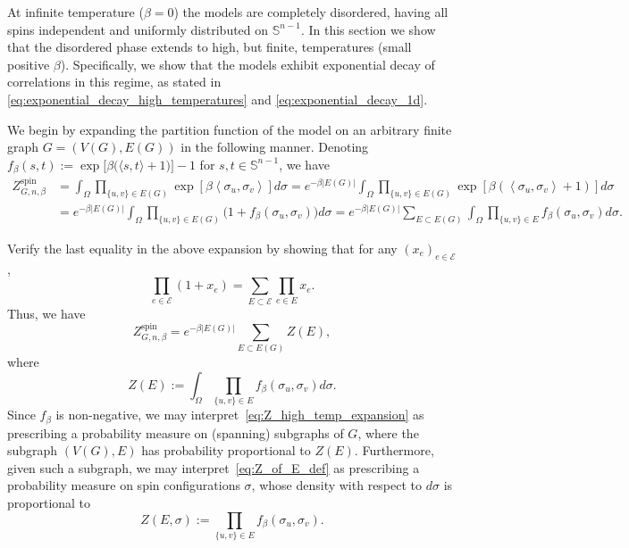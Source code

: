 \documentclass[12pt,reqno]{article}
\renewcommand{\S}{\mathbb{S}}
\begin{document}
At infinite temperature ($\beta=0$) the models are completely
disordered, having all spins independent and uniformly distributed on $\S^{n-1}$. In this section we show that the disordered phase extends to high, but finite, temperatures (small positive $\beta$). Specifically, we show that the models exhibit
exponential decay of correlations in this regime, as stated in \eqref{eq:exponential_decay_high_temperatures} and \eqref{eq:exponential_decay_1d}.

We begin by expanding the partition function of the model on an arbitrary finite graph $G = (V(G), E(G))$ in the following manner. Denoting $f_\beta(s,t) := \exp \big[\beta \big(\langle s,t
\rangle + 1\big)\big] - 1$ for $s,t \in \S^{n-1}$, we have
\begin{equation}\label{eq:high-temperature_expansion}
\begin{split}
Z^{\text{spin}}_{G,n,\beta}
 &= \int_{\Omega} \prod_{\{u,v\}\in
    E(G)} \exp \left[\beta \left\langle\sigma_u,\sigma_v\right\rangle\right] d\sigma
 = e^{-\beta |E(G)|} \int_{\Omega} \prod_{\{u,v\}\in
    E(G)} \exp \left[\beta \left(\left\langle\sigma_u,\sigma_v\right\rangle + 1\right)\right] d\sigma \\
 &= e^{-\beta |E(G)|} \int_{\Omega} \prod_{\{u,v\}\in
    E(G)} \big( 1 + f_\beta(\sigma_u,\sigma_v) \big) d\sigma
 = e^{-\beta |E(G)|} \sum_{E \subset E(G)} \int_{\Omega} \prod_{\{u,v\}\in
    E} f_\beta(\sigma_u,\sigma_v) d\sigma.
\end{split}
\end{equation}

\medbreak
{}
Verify the last equality in the above expansion by showing that for any $(x_e)_{e \in \mathcal{E}}$,
\[ \prod_{e \in \mathcal{E}} (1+x_e) = \sum_{E \subset \mathcal{E}} \prod_{e \in E} x_e .\]
\medbreak
Thus, we have
\begin{equation}\label{eq:Z_high_temp_expansion}
Z^{\text{spin}}_{G,n,\beta} = e^{-\beta |E(G)|} \sum_{E \subset
E(G)} Z(E) ,
\end{equation}
where
\begin{equation}\label{eq:Z_of_E_def}
Z(E) := \int_{\Omega} \prod_{\{u,v\}\in E}
f_\beta(\sigma_u,\sigma_v) d\sigma .
\end{equation}
Since $f_\beta$ is non-negative, we may interpret~\eqref{eq:Z_high_temp_expansion} as prescribing a
probability measure on (spanning) subgraphs of $G$, where the
subgraph $(V(G),E)$ has probability proportional to $Z(E)$.
Furthermore, given such a subgraph, we may
interpret~\eqref{eq:Z_of_E_def} as prescribing a probability measure
on spin configurations $\sigma$, whose density with respect to
$d\sigma$ is proportional to
\[ Z(E,\sigma) := \prod_{\{u,v\}\in E} f_\beta(\sigma_u,\sigma_v) .\]
\end{document}
